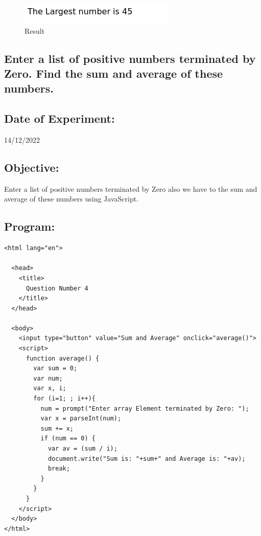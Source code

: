 \documentclass[12pt, a4paper]{article}
\begin{document}
\begin{figure}[h]
  \centering
  \includegraphics{29}
  \caption{Result}
\end{figure}

\pagebreak

\begin{tcolorbox}
  \section{Enter a list of positive numbers terminated by Zero. Find the sum and average of these numbers.}
\end{tcolorbox}
\subsection*{Date of Experiment:}
14/12/2022
\subsection*{Objective:}
Enter a list of positive numbers terminated by Zero also we have to the sum and average of these numbers using JavaScript.

\subsection*{Program:}
\begin{lstlisting}
<html lang="en">

  <head>
    <title>
      Question Number 4
    </title>
  </head>

  <body>
    <input type="button" value="Sum and Average" onclick="average()">
    <script>
      function average() {
        var sum = 0;
        var num;
        var x, i;
        for (i=1; ; i++){
          num = prompt("Enter array Element terminated by Zero: ");
          var x = parseInt(num);
          sum += x;
          if (num == 0) {
            var av = (sum / i);
            document.write("Sum is: "+sum+" and Average is: "+av);
            break;
          }
        }
      }
    </script>
  </body>
</html>
\end{lstlisting}
\end{document}
